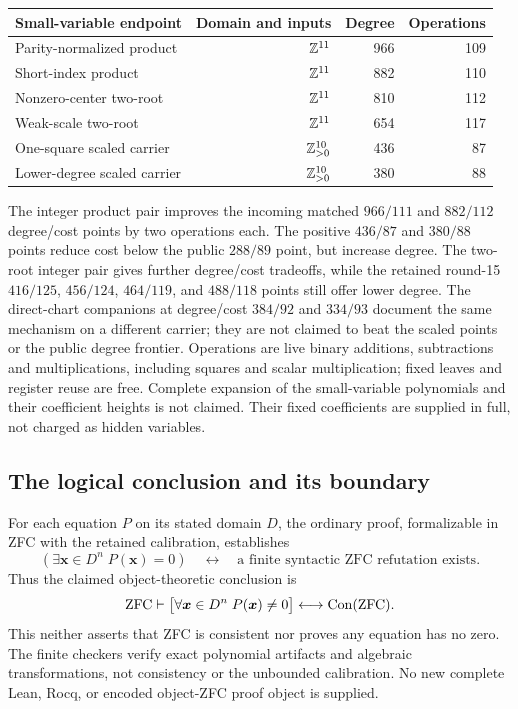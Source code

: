 \begin{center}\small
\begin{tabular}{@{}lrrr@{}}\toprule
Small-variable endpoint&Domain and inputs&Degree&Operations\\\midrule
Parity-normalized product&$\mathbb Z^{11}$&966&109\\
Short-index product&$\mathbb Z^{11}$&882&110\\
Nonzero-center two-root&$\mathbb Z^{11}$&810&112\\
Weak-scale two-root&$\mathbb Z^{11}$&654&117\\
One-square scaled carrier&$\mathbb Z_{>0}^{10}$&436&87\\
Lower-degree scaled carrier&$\mathbb Z_{>0}^{10}$&380&88\\
\bottomrule
\end{tabular}\end{center}
The integer product pair improves the incoming matched $966/111$ and $882/112$ degree/cost points by two operations each. The positive $436/87$ and $380/88$ points reduce cost below the public $288/89$ point, but increase degree. The two-root integer pair gives further degree/cost tradeoffs, while the retained round-15 $416/125$, $456/124$, $464/119$, and $488/118$ points still offer lower degree. The direct-chart companions at degree/cost $384/92$ and $334/93$ document the same mechanism on a different carrier; they are not claimed to beat the scaled points or the public degree frontier. Operations are live binary additions, subtractions and multiplications, including squares and scalar multiplication; fixed leaves and register reuse are free. Complete expansion of the small-variable polynomials and their coefficient heights is not claimed. Their fixed coefficients are supplied in full, not charged as hidden variables.

\subsection{The logical conclusion and its boundary}
For each equation $P$ on its stated domain $D$, the ordinary proof, formalizable in ZFC with the retained calibration, establishes
\[
 (\exists \boldsymbol{x}\in D^n\;P(\boldsymbol{x})=0)
 \quad\longleftrightarrow\quad
 \text{a finite syntactic ZFC refutation exists}.
\]
Thus the claimed object-theoretic conclusion is
\[
 \mathrm{ZFC}\vdash
 \bigl[\forall\boldsymbol{x}\in D^n\;P(\boldsymbol{x})\ne0\bigr]
 \longleftrightarrow\operatorname{Con}(\mathrm{ZFC}).
\]
This neither asserts that ZFC is consistent nor proves any equation has no zero. The finite checkers verify exact polynomial artifacts and algebraic transformations, not consistency or the unbounded calibration. No new complete Lean, Rocq, or encoded object-ZFC proof object is supplied.

